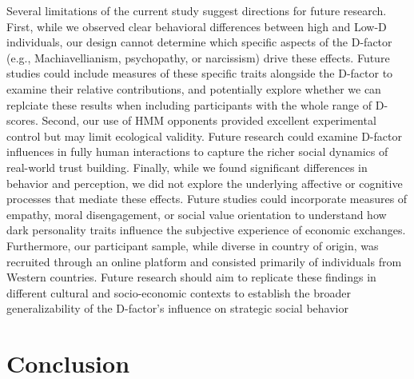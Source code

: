 \documentclass[
]{article}
\begin{document}
Several limitations of the current study suggest directions for future research. First, while we observed clear behavioral differences between high and Low-D individuals, our design cannot determine which specific aspects of the D-factor (e.g., Machiavellianism, psychopathy, or narcissism) drive these effects. Future studies could include measures of these specific traits alongside the D-factor to examine their relative contributions, and potentially explore whether we can replciate these results when including participants with the whole range of D-scores.
Second, our use of HMM opponents provided excellent experimental control but may limit ecological validity. Future research could examine D-factor influences in fully human interactions to capture the richer social dynamics of real-world trust building.
Finally, while we found significant differences in behavior and perception, we did not explore the underlying affective or cognitive processes that mediate these effects. Future studies could incorporate measures of empathy, moral disengagement, or social value orientation to understand how dark personality traits influence the subjective experience of economic exchanges. Furthermore, our participant sample, while diverse in country of origin, was recruited through an online platform and consisted primarily of individuals from Western countries. Future research should aim to replicate these findings in different cultural and socio-economic contexts to establish the broader generalizability of the D-factor's influence on strategic social behavior

\section{Conclusion}\label{conclusion}
\end{document}
